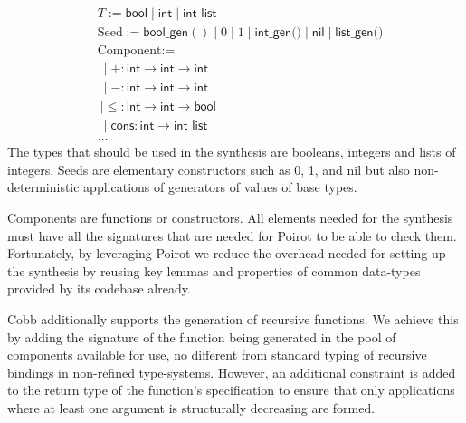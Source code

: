 \documentclass[review, sigplan]{acmart}
\begin{document}
\begin{align*}
   & T := \textsf{bool} \mid \textsf{int} \mid \textsf{int list}                                                            \\
   & \text{Seed} := \textsf{bool\_gen}() \mid 0 \mid 1 \mid \textsf{int\_gen()} \mid \textsf{nil} \mid \textsf{list\_gen()} \\
   & \text{Component} :=                                                                                                    \\
   & \  \mid +: \textsf{int} \rightarrow \textsf{int} \rightarrow \textsf{int}                                              \\
   & \  \mid -: \textsf{int} \rightarrow \textsf{int} \rightarrow \textsf{int}                                              \\
   & \  \mid \leq: \textsf{int} \rightarrow \textsf{int} \rightarrow \textsf{bool}                                          \\
   & \  \mid \textsf{cons}: \textsf{int} \rightarrow \textsf{int list}                                                      \\
   & \dots
\end{align*}
The types that should be used in the synthesis are
booleans, integers and lists of integers.
Seeds are elementary constructors such as 0, 1, and \textsf{nil}
but also non-deterministic applications of generators of values of
base types.

Components are functions or constructors.
All elements needed for the synthesis must have all the signatures
that are needed for Poirot to be able to check them.
Fortunately, by leveraging Poirot we reduce the overhead needed for setting
up the synthesis by reusing key lemmas and properties of common
data-types provided by its codebase already.

Cobb additionally supports the generation of recursive functions.
We achieve this by adding the signature of the function being
generated in the pool of components available for use,
no different from standard typing of recursive bindings in non-refined
type-systems.
However, an additional constraint is added to the return type
of the function's specification to ensure that only applications
where at least one argument is structurally decreasing are formed.
\end{document}
